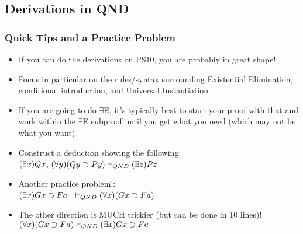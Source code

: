 \subsection{Derivations in QND}

\begin{frame}
\frametitle{Quick Tips and a Practice Problem}

\begin{itemize}[<+->]

\item If you can do the derivations on PS10, you are probably in great shape! 

\item Focus in particular on the rules/syntax surrounding Existential Elimination, conditional introduction, and Universal Instantiation 

\item If you are going to do $\exists$E, it's typically best to start your proof with that and work within the $\exists$E subproof until you get what you need (which may not be what you want) 

\item Construct a deduction showing the following: \\ $(\exists x) Qx$, $(\forall y) (Qy \supset Py) \vdash_{QND} (\exists z) Pz$

\item Another practice problem!: \\ $(\exists x) Gx \supset  Fa \; \;$  $ \vdash_{QND} (\forall x) (Gx \supset Fa)  $ 

\item The other direction is MUCH trickier (but can be done in 10 lines)! \\ $(\forall x) (Gx \supset Fa)   \vdash_{QND}  (\exists x) Gx \supset Fa$




\end{itemize}
\end{frame}



